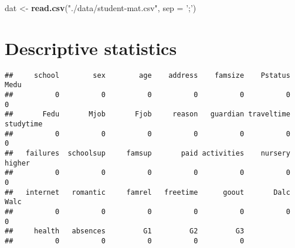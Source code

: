 \documentclass[
]{article}
\newenvironment{Shaded}{\begin{snugshade}}{\end{snugshade}}
\newcommand{\CommentTok}[1]{\textcolor[rgb]{0.56,0.35,0.01}{\textit{#1}}}
\newcommand{\DataTypeTok}[1]{\textcolor[rgb]{0.13,0.29,0.53}{#1}}
\newcommand{\DecValTok}[1]{\textcolor[rgb]{0.00,0.00,0.81}{#1}}
\newcommand{\KeywordTok}[1]{\textcolor[rgb]{0.13,0.29,0.53}{\textbf{#1}}}
\newcommand{\NormalTok}[1]{#1}
\newcommand{\OperatorTok}[1]{\textcolor[rgb]{0.81,0.36,0.00}{\textbf{#1}}}
\newcommand{\StringTok}[1]{\textcolor[rgb]{0.31,0.60,0.02}{#1}}
\begin{document}
\begin{Shaded}
\begin{Highlighting}[]
\NormalTok{dat <-}\StringTok{ }\KeywordTok{read.csv}\NormalTok{(}\StringTok{"./data/student-mat.csv"}\NormalTok{, }\DataTypeTok{sep =} \StringTok{';'}\NormalTok{)}
\end{Highlighting}
\end{Shaded}

\hypertarget{descriptive-statistics}{%
\section{Descriptive statistics}\label{descriptive-statistics}}

\begin{Shaded}
\end{Shaded}

\begin{verbatim}
##     school        sex        age    address    famsize    Pstatus       Medu 
##          0          0          0          0          0          0          0 
##       Fedu       Mjob       Fjob     reason   guardian traveltime  studytime 
##          0          0          0          0          0          0          0 
##   failures  schoolsup     famsup       paid activities    nursery     higher 
##          0          0          0          0          0          0          0 
##   internet   romantic     famrel   freetime      goout       Dalc       Walc 
##          0          0          0          0          0          0          0 
##     health   absences         G1         G2         G3 
##          0          0          0          0          0
\end{verbatim}

\begin{Shaded}
\end{Shaded}
\end{document}

